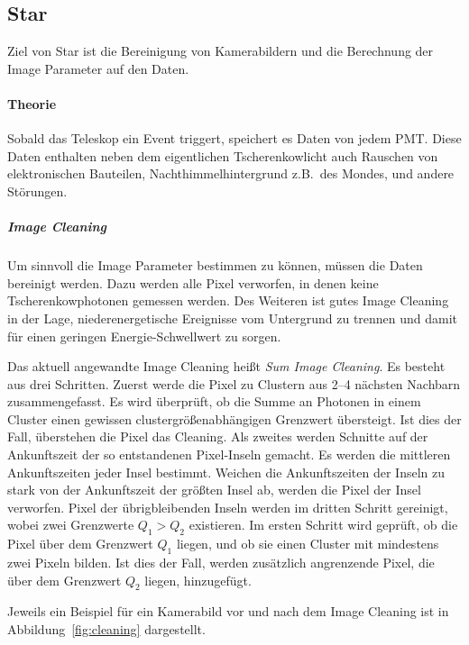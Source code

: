 \subsection{Star}%
\label{sub:star}
Ziel von Star ist die Bereinigung von Kamerabildern und die Berechnung
der Image Parameter auf den Daten.

\paragraph{Theorie}
Sobald das Teleskop ein Event triggert,
speichert es Daten von jedem PMT.\@
Diese Daten enthalten neben dem eigentlichen Tscherenkowlicht auch
Rauschen von elektronischen Bauteilen,
Nachthimmelhintergrund  z.B.\ des Mondes,
und andere Störungen.

\subparagraph{Image Cleaning}
Um sinnvoll die Image Parameter bestimmen zu können,
müssen die Daten bereinigt werden.
Dazu werden alle Pixel verworfen, in denen keine 
Tscherenkowphotonen gemessen werden.
Des Weiteren ist gutes Image Cleaning in der Lage,
niederenergetische Ereignisse vom Untergrund zu trennen und damit
für einen geringen Energie-Schwellwert zu sorgen.

Das aktuell angewandte Image Cleaning heißt \textit{Sum Image Cleaning}.
Es besteht aus drei Schritten.
Zuerst werde die Pixel zu Clustern aus 2--4 nächsten Nachbarn zusammengefasst.
Es wird überprüft, ob die Summe an Photonen in einem Cluster
einen gewissen clustergrößenabhängigen Grenzwert übersteigt.
Ist dies der Fall, überstehen die Pixel das Cleaning.
Als zweites werden Schnitte auf der Ankunftszeit der so entstandenen
Pixel-Inseln gemacht.
Es werden die mittleren Ankunftszeiten jeder Insel bestimmt.
Weichen die Ankunftszeiten der Inseln zu stark von der Ankunftszeit der größten Insel ab,
werden die Pixel der Insel verworfen.
Pixel der übrigbleibenden Inseln werden im dritten Schritt gereinigt,
wobei zwei Grenzwerte $Q_{1} > Q_{2}$ existieren.
Im ersten Schritt wird geprüft,
ob die Pixel über dem
Grenzwert $Q_{1}$ liegen,
und ob sie einen Cluster mit mindestens zwei Pixeln bilden.
Ist dies der Fall,
werden zusätzlich angrenzende Pixel,
die über dem Grenzwert $Q_{2}$ liegen,
hinzugefügt.

Jeweils ein Beispiel für ein Kamerabild vor und nach dem Image Cleaning ist in
Abbildung~\ref{fig:cleaning} dargestellt.


